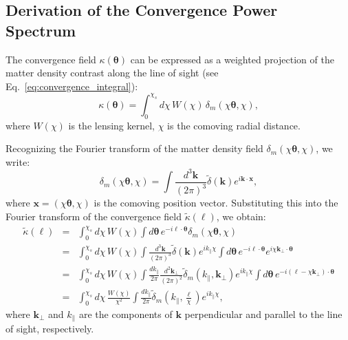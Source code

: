 \subsection{Derivation of the Convergence Power Spectrum}
The convergence field \( \kappa(\boldsymbol{\theta}) \) can be expressed as a weighted projection of the matter density contrast along the line of sight (see Eq.~\eqref{eq:convergence_integral}):
\begin{equation}
    \kappa(\boldsymbol{\theta}) = \int_0^{\chi_s} d\chi \, W(\chi) \, \delta_m\left(\chi \boldsymbol{\theta}, \chi\right),
    \label{eq:kappa_projection}
\end{equation}
where \( W(\chi) \) is the lensing kernel, \( \chi \) is the comoving radial distance.

Recognizing the Fourier transform of the matter density field \( \delta_m\left(\chi \boldsymbol{\theta}, \chi\right) \), we write:
\begin{equation}
    \delta_m\left(\chi \boldsymbol{\theta}, \chi\right) = \int \frac{d^3\mathbf{k}}{(2\pi)^3} \tilde{\delta}(\mathbf{k}) e^{i \mathbf{k} \cdot \mathbf{x}},
    \label{eq:delta_m_fourier}
\end{equation}
where \( \mathbf{x} = (\chi \boldsymbol{\theta}, \chi) \) is the comoving position vector. Substituting this into the Fourier transform of the convergence field \( \tilde{\kappa}(\boldsymbol{\ell}) \), we obtain:
\begin{eqnarray}
    \tilde{\kappa}(\boldsymbol{\ell}) &=& \int_0^{\chi_s} d\chi \, W(\chi) \int d\boldsymbol{\theta} \, e^{-i \boldsymbol{\ell} \cdot \boldsymbol{\theta}} \delta_m\left(\chi \boldsymbol{\theta}, \chi\right) \nonumber \\
    &=& \int_0^{\chi_s} d\chi \, W(\chi) \int \frac{d^3\mathbf{k}}{(2\pi)^3} \tilde{\delta}(\mathbf{k}) e^{i k_\parallel \chi} \int d\boldsymbol{\theta} \, e^{-i \boldsymbol{\ell} \cdot \boldsymbol{\theta}} e^{i \chi \mathbf{k}_\perp \cdot \boldsymbol{\theta}} \nonumber \\
    &=& \int_0^{\chi_s} d\chi \, W(\chi) \int \frac{dk_\parallel}{2\pi} \frac{d^2\mathbf{k}_\perp}{(2\pi)^2} \tilde{\delta}_m(k_\parallel, \mathbf{k}_\perp) e^{i k_\parallel \chi} \int d\boldsymbol{\theta} \, e^{-i (\boldsymbol{\ell} - \chi \mathbf{k}_\perp) \cdot \boldsymbol{\theta}} \nonumber \\
    &=& \int_0^{\chi_s} d\chi \, \frac{W(\chi)}{\chi^2} \int \frac{dk_\parallel}{2\pi} \tilde{\delta}_m\left(k_\parallel, \frac{\boldsymbol{\ell}}{\chi}\right) e^{i k_\parallel \chi},
    \label{eq:kappa_fourier_final}
\end{eqnarray}
where \( \mathbf{k}_\perp \) and \( k_\parallel \) are the components of \( \mathbf{k} \) perpendicular and parallel to the line of sight, respectively.


